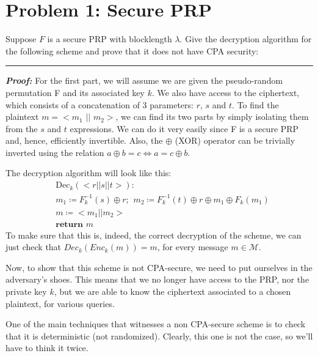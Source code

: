 \section{Problem 1: Secure PRP}\label{sec:problem1}

Suppose $F$ is a secure PRP with blocklength $\lambda$.
Give the decryption algorithm for the following scheme and prove that it does not have CPA security:

\begin{center}
    \rule{5cm}{0.4pt}
\end{center}

\textbf{\textit{Proof:}}
For the first part, we will assume we are given the pseudo-random permutation F and its associated key $k$. We also have access to the ciphertext, which consists of a concatenation of 3 parameters: $r$, $s$ and $t$. To find the plaintext $m = <m_1$ $\vert \vert$ $m_2>$, we can find its two parts by simply isolating them from the $s$ and $t$ expressions. We can do it very easily since F is a secure PRP and, hence, efficiently invertible. Also, the $\oplus$ (XOR) operator can be trivially inverted using the relation $a \oplus b = c 	\Leftrightarrow a = c \oplus b$.

The decryption algorithm will look like this:
\begin{equation*}
    \begin{split}
        & \text{Dec}_{k} (<r \vert \vert s \vert \vert t>): \\
        & m_1 \coloneqq F_k^{-1} (s) \oplus r; \hspace{5pt} m_2 \coloneqq F_k^{-1} (t) \oplus r \oplus m_1 \oplus F_k (m_1) \\
        & m \coloneqq <m_1 \vert \vert m_2> \\
        & \textbf{return } m
    \end{split}
\end{equation*}
To make sure that this is, indeed, the correct decryption of the scheme, we can just check that $Dec_k (Enc_k (m)) = m$, for every message $m \in \mathcal{M}$.

Now, to show that this scheme is not CPA-secure, we need to put ourselves in the adversary's shoes. This means that we no longer have access to the PRP, nor the private key $k$, but we are able to know the ciphertext associated to a chosen plaintext, for various queries.

One of the main techniques that witnesses a non CPA-secure scheme is to check that it is deterministic (not randomized). Clearly, this one is not the case, so we'll have to think it twice.

